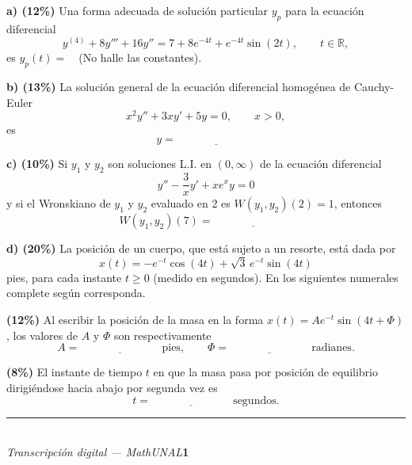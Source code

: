 \documentclass[11pt]{article}
\newcommand{\rp}{\underline{\hspace{3cm}}}
\begin{document}
\vspace{0.25cm}
\noindent\textbf{a) (12\%)} Una forma adecuada de solución particular $y_p$ para la ecuación diferencial
\[
y^{(4)}+8y'''+16y''=7+8e^{-4t}+e^{-4t}\sin(2t), \qquad t\in\mathbb{R},
\]
es $y_p(t)=$~\rp\ (No halle las constantes).

\vspace{0.3cm}
\noindent\textbf{b) (13\%)} La solución general de la ecuación diferencial homogénea de Cauchy-Euler
\[
x^2y''+3xy'+5y=0, \qquad x>0,
\]
es
\[
y=\rp
\]

\vspace{0.3cm}
\noindent\textbf{c) (10\%)} Si $y_1$ y $y_2$ son soluciones L.I. en $(0,\infty)$ de la ecuación diferencial
\[
y''-\frac{3}{x}y'+xe^xy=0
\]
y si el Wronskiano de $y_1$ y $y_2$ evaluado en 2 es $W(y_1,y_2)(2)=1$, entonces
\[
W(y_1,y_2)(7)=\rp
\]

\vspace{0.3cm}
\noindent\textbf{d) (20\%)} La posición de un cuerpo, que está sujeto a un resorte, está dada por
\[
x(t)=-e^{-t}\cos(4t)+\sqrt3\,e^{-t}\sin(4t)
\]
pies, para cada instante $t\geq 0$ (medido en segundos). En los siguientes numerales complete según corresponda.

\begin{opciones}
\item \textbf{(12\%)} Al escribir la posición de la masa en la forma $x(t)=Ae^{-t}\sin(4t+\Phi)$, los valores de $A$ y $\Phi$ son respectivamente
\[
A=\rp\ \text{pies}, \qquad \Phi=\rp\ \text{radianes}.
\]
\item \textbf{(8\%)} El instante de tiempo $t$ en que la masa pasa por posición de equilibrio dirigiéndose hacia abajo por segunda vez es
\[
t=\rp\ \text{segundos}.
\]
\end{opciones}

\vfill
\rule{\linewidth}{0.4pt}\\[1pt]
{\scriptsize\textit{Transcripción digital --- MathUNAL}\hfill\textcolor{unalblue}{\textbf{1}}}
\end{document}
